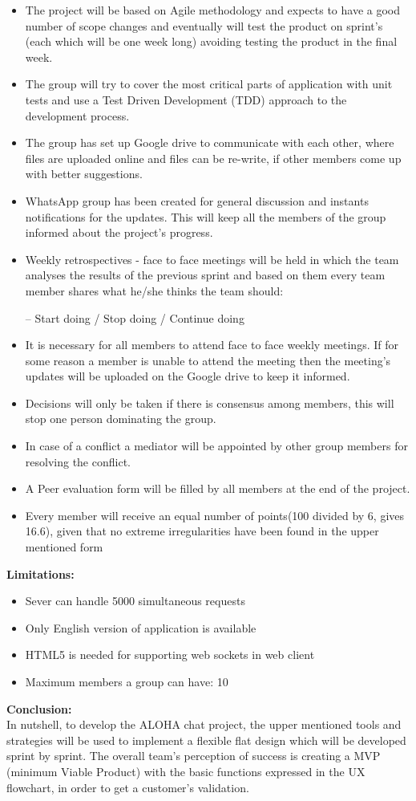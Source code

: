 \documentclass[12pt]{article}
\begin{document}
\begin{itemize}
    \item The project will be based on Agile methodology and expects to have a good number of scope changes and eventually will test the product on sprint's (each which will be one week long) avoiding testing the product in the final week.
    \item The group will try to cover the most critical parts of application with unit tests and use a Test Driven Development (TDD) approach to the development process.
    \item The group has set up Google drive to communicate with each other, where files are uploaded online and files can be re-write, if other members come up with better suggestions. 
    \item WhatsApp group has been created for general discussion and instants notifications for the updates. This will keep all the members of the group informed about the project's progress.
    \item Weekly retrospectives - face to face meetings will be held in which the team analyses the results of the previous sprint and based on them every team member shares what he/she thinks the team should:
        \item[--] Start doing / Stop doing / Continue doing
    \item It is necessary for all members to attend face to face weekly meetings. If for some reason a member is unable to attend the meeting then the meeting's updates will be uploaded on the Google drive to keep it informed.  
    \item Decisions will only be taken if there is consensus among members, this will stop one person dominating the group.
    \item In case of a conflict a mediator will be appointed by other group members for resolving the conflict.
    \item A Peer evaluation form will be filled by all members at the end of the project.
    \item Every member will receive an equal number of points(100 divided by 6, gives 16.6), given that no extreme irregularities have been found in the upper mentioned form
\end{itemize}

\textbf{Limitations:}
\begin{itemize}
\item Sever can handle 5000 simultaneous requests 
\item Only English version of application is available
\item HTML5 is needed for supporting web sockets in web client
\item Maximum members a group can have: 10
\end{itemize}

\textbf{Conclusion:}\\
In nutshell, to develop the ALOHA chat project, the upper mentioned tools and strategies will be used to implement a flexible flat design which will be developed sprint by sprint. The overall team's perception of success is creating a MVP (minimum Viable Product) with the basic functions expressed in the UX flowchart, in order to get a customer’s validation.
\end{document}
